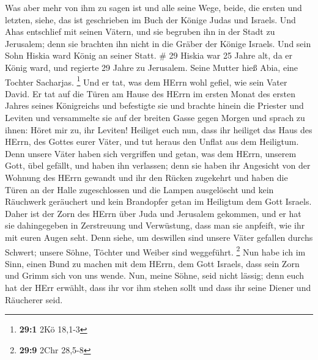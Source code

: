  Was aber mehr von ihm zu sagen ist und alle seine Wege,
beide, die ersten und letzten, siehe, das ist geschrieben im Buch der
Könige Judas und Israels.  Und Ahas entschlief mit seinen
Vätern, und sie begruben ihn in der Stadt zu Jerusalem; denn sie
brachten ihn nicht in die Gräber der Könige Israels. Und sein Sohn
Hiskia ward König an seiner Statt. \# 29  Hiskia war 25
Jahre alt, da er König ward, und regierte 29 Jahre zu Jerusalem. Seine
Mutter hieß Abia, eine Tochter Sacharjas. \footnote{\textbf{29:1} 2Kö
  18,1-3}  Und er tat, was dem HErrn wohl gefiel, wie sein
Vater David.  Er tat auf die Türen am Hause des HErrn im
ersten Monat des ersten Jahres seines Königreichs und befestigte sie
 und brachte hinein die Priester und Leviten und versammelte
sie auf der breiten Gasse gegen Morgen  und sprach zu ihnen:
Höret mir zu, ihr Leviten! Heiliget euch nun, dass ihr heiliget das Haus
des HErrn, des Gottes eurer Väter, und tut heraus den Unflat aus dem
Heiligtum.  Denn unsere Väter haben sich vergriffen und
getan, was dem HErrn, unserem Gott, übel gefällt, und haben ihn
verlassen; denn sie haben ihr Angesicht von der Wohnung des HErrn
gewandt und ihr den Rücken zugekehrt  und haben die Türen an
der Halle zugeschlossen und die Lampen ausgelöscht und kein Räuchwerk
geräuchert und kein Brandopfer getan im Heiligtum dem Gott Israels.
 Daher ist der Zorn des HErrn über Juda und Jerusalem
gekommen, und er hat sie dahingegeben in Zerstreuung und Verwüstung,
dass man sie anpfeift, wie ihr mit euren Augen seht.  Denn
siehe, um deswillen sind unsere Väter gefallen durchs Schwert; unsere
Söhne, Töchter und Weiber sind weggeführt. \footnote{\textbf{29:9} 2Chr
  28,5-8}  Nun habe ich im Sinn, einen Bund zu machen mit
dem HErrn, dem Gott Israels, dass sein Zorn und Grimm sich von uns
wende.  Nun, meine Söhne, seid nicht lässig; denn euch hat
der HErr erwählt, dass ihr vor ihm stehen sollt und dass ihr seine
Diener und Räucherer seid.

